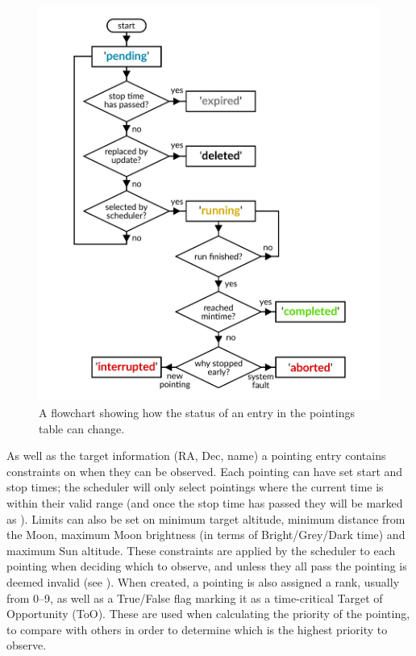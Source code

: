 \begin{colsection}
\begin{colsection}
\begin{figure}[p]
    \begin{center}
        \includegraphics[width=0.9\linewidth]{images/pointings_flowchart.pdf}
    \end{center}
    \caption[Pointing status progression flowchart]{
        A flowchart showing how the status of an entry in the pointings table can change.
        }\label{fig:pointings}
\end{figure}

\clearpage

As well as the target information (RA, Dec, name) a pointing entry contains constraints on when they can be observed. Each pointing can have set start and stop times; the scheduler will only select pointings where the current time is within their valid range (and once the stop time has passed they will be marked as ). Limits can also be set on minimum target altitude, minimum distance from the Moon, maximum Moon brightness (in terms of Bright/Grey/Dark time) and maximum Sun altitude. These constraints are applied by the scheduler to each pointing when deciding which to observe, and unless they all pass the pointing is deemed invalid (see ). When created, a pointing is also assigned a rank, usually from 0--9, as well as a True/False flag marking it as a time-critical Target of Opportunity (ToO). These are used when calculating the priority of the pointing, to compare with others in order to determine which is the highest priority to observe.


\end{colsection}
\end{colsection}
